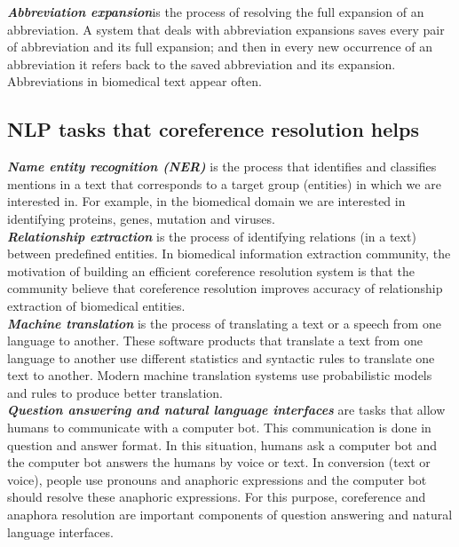 \emph{\textbf{Abbreviation expansion}}is the process of resolving the full expansion of an abbreviation. A system that deals with abbreviation expansions saves every pair of abbreviation and its full expansion; and then in every new occurrence of an abbreviation it refers back to the saved abbreviation and its expansion. Abbreviations in biomedical text appear often. \\

\subsection{NLP tasks that coreference resolution helps}

\emph {\textbf{ Name entity recognition (NER)}} is the process that identifies and classifies mentions in a text that corresponds to a target group (entities) in which we are interested in. For example, in the biomedical domain we are interested in identifying proteins, genes, mutation and viruses. \\

\emph{\textbf{Relationship extraction}} is the process of identifying relations (in a text) between predefined entities. In biomedical information extraction community, the motivation of building an efficient coreference resolution system is that the community believe that coreference resolution improves accuracy of relationship extraction of biomedical entities. \\

\emph{\textbf{Machine translation}} is the process of translating a text or a speech from one language to another. These software products that translate a text from one language to another use different statistics and syntactic rules to translate one text to another. Modern machine translation systems use probabilistic models and rules to produce better translation. \\

\emph{\textbf{Question answering and natural language interfaces}} are tasks that allow humans to communicate with a computer bot. This communication is done in question and answer format. In this situation, humans ask a computer bot and the computer bot answers the humans by voice or text. In conversion (text or voice), people use pronouns and anaphoric expressions and the computer bot should resolve these anaphoric expressions. For this purpose, coreference and anaphora resolution are important components of question answering and natural language interfaces.\\

